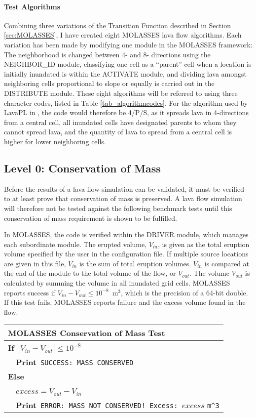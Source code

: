 \paragraph{Test Algorithms} Combining three variations of the Transition Function described in Section \ref{sec:MOLASSES}, I have created eight MOLASSES lava flow algorithms. Each variation has been made by modifying one module in the MOLASSES framework: The neighborhood is changed between 4- and 8- directions using the NEIGHBOR\_ID module, classifying one cell as a ``parent'' cell when a location is initially inundated is within the ACTIVATE module, and dividing lava amongst neighboring cells proportional to slope or equally is carried out in the DISTRIBUTE module. These eight algorithms will be referred to using three character codes, listed in Table \ref{tab_algorithmcodes}. For the algorithm used by LavaPL in \citet{connor2012}, the code would therefore be 4/P/S, as it spreads lava in 4-directions from a central cell, all inundated cells have designated parents to whom they cannot spread lava, and the quantity of lava to spread from a central cell is higher for lower neighboring cells.

	\subsection{Level 0: Conservation of Mass}
			Before the results of a lava flow simulation can be validated, it must be verified to at least prove that conservation of mass is preserved. A lava flow simulation will therefore not be tested against the following benchmark tests until this conservation of mass requirement is shown to be fulfilled.
			
			In MOLASSES, the code is verified within the DRIVER module, which manages each subordinate module. The erupted volume, $V_{in}$, is given as the total eruption volume specified by the user in the configuration file. If multiple source locations are given in this file, $V_{in}$ is the sum of total eruption volumes. $V_{in}$ is compared at the end of the module to the total volume of the flow, or $V_{out}$. The volume $V_{out}$ is calculated by summing the volume in all inundated grid cells. MOLASSES reports success if $V_{in}-V_{out} \le 10^{-8}$~m$^3$, which is the precision of a 64-bit double. If this test fails, MOLASSES reports failure and the excess volume found in the flow.
	
			\begin{center}
				\begin{tabular}{l}
					\toprule
					\textbf{MOLASSES Conservation of Mass Test}\\
					\midrule
					\textbf{If}~$|V_{in}-V_{out}| \le 10^{-8}$\\
					~~\textbf{Print}~\verb|SUCCESS: MASS CONSERVED|\\
					\textbf{Else}\\
					~~$excess = V_{out}-V_{in}$\\
					~~\textbf{Print}~\verb|ERROR: MASS NOT CONSERVED! Excess: |$excess$ \verb|m^3|\\
					\bottomrule
				\end{tabular}
			\end{center}

